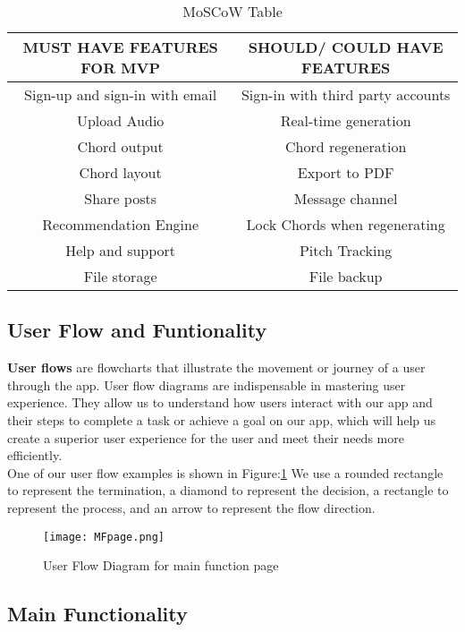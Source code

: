 \begin{table}[ht]
\centering
\begin{tabular}{ |c|c| } 
 \hline
\textbf{MUST HAVE FEATURES FOR MVP} & \textbf{SHOULD/ COULD HAVE FEATURES}\\ 
 \hline
 Sign-up and sign-in with email & Sign-in with third party accounts \\ 
 \hline
 Upload Audio & Real-time generation \\ 
 \hline
 Chord output & Chord regeneration \\ 
 \hline
 Chord layout &  Export to PDF \\ 
 \hline
 Share posts & Message channel \\ 
 \hline
 Recommendation Engine &  Lock Chords when regenerating\\ 
 \hline
 Help and support &  Pitch Tracking\\ 
 \hline
 File storage& File backup \\ 
 \hline
 \end{tabular}
 \caption{MoSCoW Table}
 \centering
 \end{table}
 
 \subsection{User Flow and Funtionality}
 \textbf{User flows} are flowcharts that illustrate the movement or journey of a user through the app. User flow diagrams are indispensable in mastering user experience. 
 They allow us to understand how users interact with our app and their steps to complete a task or achieve a goal on our app, 
 which will help us create a superior user experience for the user and meet their needs more efficiently. 
 \\One of our user flow examples is shown in Figure:\ref{flowchartmain}
 We use a rounded rectangle to represent the termination, a diamond to represent the decision, a rectangle to represent the process, and an arrow to represent the flow direction.

\begin{figure}[ht]
\centering
\texttt{[image: MFpage.png]}
\caption{User Flow Diagram for main function page}
\label{flowchartmain}
\end{figure}


\subsection*{Main Functionality}

